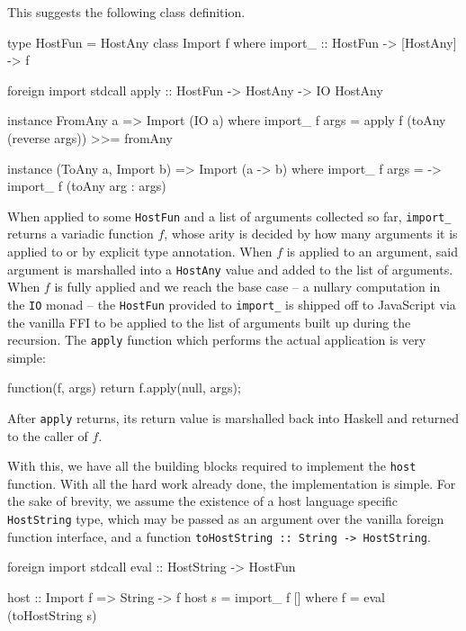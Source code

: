 \documentclass[preprint]{sigplanconf}
\begin{document}
This suggests the following class definition.

\begin{code}
type HostFun = HostAny
class Import f where
  import_ :: HostFun -> [HostAny] -> f

foreign import stdcall
  apply :: HostFun -> HostAny -> IO HostAny

instance FromAny a => Import (IO a) where
  import_ f args =
    apply f (toAny (reverse args)) >>= fromAny

instance (ToAny a, Import b) =>
         Import (a -> b) where
  import_ f args =
    \arg -> import_ f (toAny arg : args)
\end{code}

When applied to some \lstinline!HostFun! and a list of arguments collected so
far, \lstinline!import_! returns a variadic function $f$, whose arity is decided
by how many arguments it is applied to or by explicit type annotation.
When $f$ is applied to an argument, said argument is marshalled into a
\lstinline!HostAny! value and added to the list of arguments.
When $f$ is fully applied and we reach the base case -- a nullary computation
in the \lstinline!IO! monad -- the \lstinline!HostFun! provided to
\lstinline!import_! is shipped off to JavaScript via the vanilla FFI to be
applied to the list of arguments built up during the recursion.
The \lstinline!apply! function which performs the actual application is very
simple:

\begin{code}
function(f, args) {
  return f.apply(null, args);
}
\end{code}

After \lstinline!apply! returns, its return value is marshalled back into
Haskell and returned to the caller of $f$.

With this, we have all the building blocks required to implement the
\lstinline!host! function. With all the hard work already done, the
implementation is simple. For the sake of brevity, we assume the
existence of a host language specific \lstinline!HostString! type, which may
be passed as an argument over the vanilla foreign function interface, and a
function \lstinline!toHostString :: String -> HostString!.

\begin{code}
foreign import stdcall
  eval :: HostString -> HostFun

host :: Import f => String -> f
host s = import_ f []
  where
    f = eval (toHostString s)
\end{code}
\end{document}
